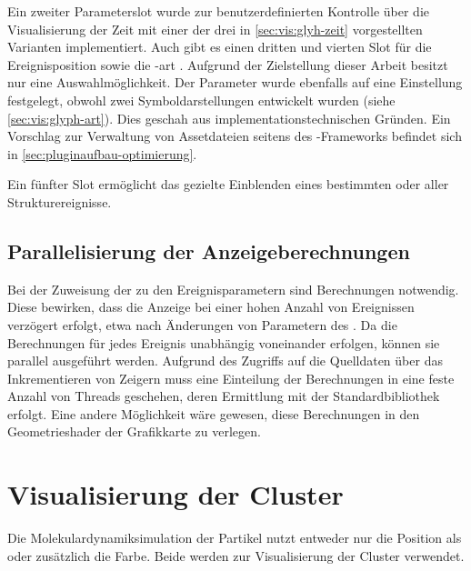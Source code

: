 Ein zweiter Parameterslot  wurde zur benutzerdefinierten Kontrolle über die Visualisierung der Zeit mit einer der drei in \autoref{sec:vis:glyh-zeit} vorgestellten Varianten implementiert. Auch gibt es einen dritten und vierten Slot für die Ereignisposition  sowie die -art . Aufgrund der Zielstellung dieser Arbeit besitzt  nur eine Auswahlmöglichkeit. Der Parameter  wurde ebenfalls auf eine Einstellung festgelegt, obwohl zwei Symboldarstellungen entwickelt wurden (siehe \autoref{sec:vis:glyph-art}). Dies geschah aus implementationstechnischen Gründen. Ein Vorschlag zur Verwaltung von Assetdateien seitens des -Frameworks befindet sich in \autoref{sec:pluginaufbau-optimierung}.


Ein fünfter Slot  ermöglicht das gezielte Einblenden eines bestimmten oder aller Strukturereignisse.


\subsection*{Parallelisierung der Anzeigeberechnungen}
Bei der Zuweisung der  zu den Ereignisparametern sind Berechnungen notwendig. Diese bewirken, dass die Anzeige bei einer hohen Anzahl von Ereignissen verzögert erfolgt, etwa nach Änderungen von Parametern des . Da die Berechnungen für jedes Ereignis unabhängig voneinander erfolgen, können sie parallel ausgeführt werden. Aufgrund des Zugriffs auf die Quelldaten über das Inkrementieren von Zeigern muss eine Einteilung der Berechnungen in eine feste Anzahl von Threads geschehen, deren Ermittlung mit der  Standardbibliothek  erfolgt. Eine andere Möglichkeit wäre gewesen, diese Berechnungen in den Geometrieshader der Grafikkarte zu verlegen.


\section{Visualisierung der Cluster}\label{sec:visualisierung:cluster}
Die  Molekulardynamiksimulation der Partikel nutzt entweder nur die Position als  oder zusätzlich die Farbe. Beide werden zur Visualisierung der Cluster verwendet.

